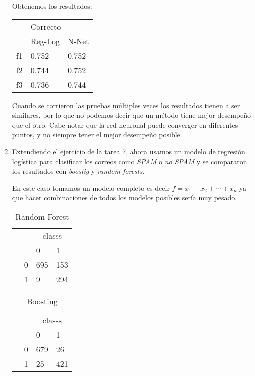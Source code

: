 \documentclass{article}
\begin{document}
\begin{enumerate}
    Obtenemos los resultados:
    \begin{table}[H]
    \centering
    \label{ej2}
    \begin{tabular}{lll}
    \multirow{2}{*}{} & \multicolumn{2}{l}{Correcto} \\
                      & Reg-Log        & N-Net       \\
    f1                & 0.752          &  0.752     \\
    f2                & 0.744          &  0.752\\
    f3                & 0.736          &  0.744
    \end{tabular}
    \end{table}

    Cuando se corrieron las pruebas múltiples veces los resultados tienen a ser similares, por lo que no podemos decir que un método tiene mejor desempeño que el otro. Cabe notar que la red neuronal puede converger en diferentes puntos, y no siempre tener el mejor desempeño posible.

    \item Extendiendo el ejercicio de la tarea 7, ahora usamos un modelo de regresión logística para clasificar los correos como \emph{SPAM} o \emph{no SPAM} y se compararon los resultados con \emph{boostig} y \emph{random forests}.

    En este caso tomamos un modelo completo es decir $f = x_1 + x_2 + \cdots + x_n$ ya que hacer combinaciones de todos los modelos posibles sería muy pesado.

    \begin{table}[H]
    \centering
    \caption{Random Forest}
    \label{rforest}
    \begin{tabular}{|l|l|l|l|}
    \hline
    \multicolumn{2}{|l|}{\multirow{2}{*}{}} & \multicolumn{2}{c|}{classs} \\ \cline{3-4} 
    \multicolumn{2}{|l|}{} & 0 & 1 \\ \hline
    \multirow{1}{*}{ \parbox[t]{1mm}{} } & 0 & 695 & 153 \\ \cline{2-4} & 1 & 9 & 294 \\ \hline
    \end{tabular}
    \end{table}

    \begin{table}[H]
    \centering
    \caption{Boosting}
    \label{boost}
    \begin{tabular}{|l|l|l|l|}
    \hline
    \multicolumn{2}{|l|}{\multirow{2}{*}{}} & \multicolumn{2}{c|}{classs} \\ \cline{3-4} 
    \multicolumn{2}{|l|}{} & 0 & 1 \\ \hline
    \multirow{1}{*}{ \parbox[t]{1mm}{} } & 0 & 679 & 26 \\ \cline{2-4} & 1 & 25 & 421 \\ \hline
    \end{tabular}
    \end{table}


\end{enumerate}
\end{document}
